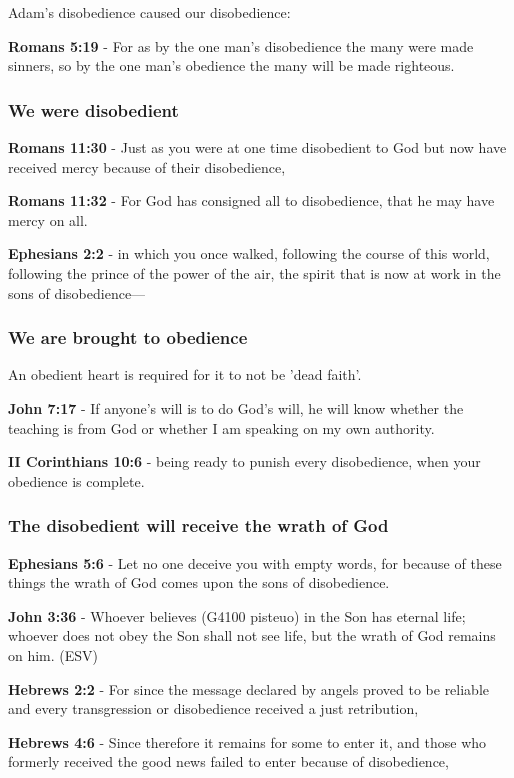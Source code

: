 \documentclass[11pt]{article}
\begin{document}
Adam's disobedience caused our disobedience:

\textbf{Romans 5:19} - For as by the one man's disobedience the many were made sinners, so by the one man's obedience the many will be made righteous.

\subsubsection{We were disobedient}
\label{sec:org762e318}
\textbf{Romans 11:30} - Just as you were at one time disobedient to God but now have received mercy because of their disobedience,

\textbf{Romans 11:32} - For God has consigned all to disobedience, that he may have mercy on all.

\textbf{Ephesians 2:2} - in which you once walked, following the course of this world, following the prince of the power of the air, the spirit that is now at work in the sons of disobedience—

\subsubsection{We are brought to obedience}
\label{sec:orgb7980a8}
An obedient heart is required for it to not be 'dead faith'.

\textbf{John 7:17} - If anyone's will is to do God's will, he will know whether the teaching is from God or whether I am speaking on my own authority.

\textbf{II Corinthians 10:6} - being ready to punish every disobedience, when your obedience is complete.

\subsubsection{The disobedient will receive the wrath of God}
\label{sec:orge7731ff}

\textbf{Ephesians 5:6} - Let no one deceive you with empty words, for because of these things the wrath of God comes upon the sons of disobedience.

\textbf{John 3:36} - Whoever believes (G4100 pisteuo) in the Son has eternal life; whoever does not obey the Son shall not see life, but the wrath of God remains on him. (ESV)

\textbf{Hebrews 2:2} - For since the message declared by angels proved to be reliable and every transgression or disobedience received a just retribution,

\textbf{Hebrews 4:6} - Since therefore it remains for some to enter it, and those who formerly received the good news failed to enter because of disobedience,
\end{document}
